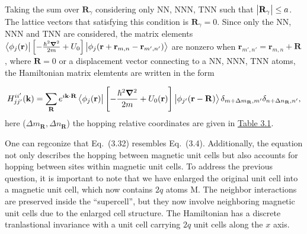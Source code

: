 Taking the sum over $\mathbf{R}_{\gamma}$ considering only \ac{NN}, \ac{NNN}, \ac{TNN} such that $\abs{\mathbf{R}_{\gamma}} \leq a$. The lattice vectors that satisfying this condition is $\mathbf{R}_{\gamma} = 0$. 
Since only the \ac{NN}, \ac{NNN} and \ac{TNN} are considered, the matrix elements $\bra{\phi_{j}(\mathbf{r})} \left[-\tfrac{\hbar^{2} \boldsymbol{\nabla}^{2}}{2m} + U_{0}\right] \ket{\phi_{j}(\mathbf{r} + \mathbf{r}_{m,n} - \mathbf{r}_{m',n'})}$ are nonzero when $\mathbf{r}_{m',n'} = \mathbf{r}_{m,n} + \mathbf{R}$, where $\mathbf{R} = 0$ or a displacement vector connecting to a \ac{NN}, \ac{NNN}, \ac{TNN} atoms, the Hamiltonian matrix elemtents are written in the form

\begin{gather}
	H_{jj'}^{ii'}(\mathbf{k}) =\sum_{\mathbf{R}} e^{i \mathbf{k}\cdot \mathbf{R}} \bra{\phi_{j}(\mathbf{r})} \left[-\dfrac{\hbar^{2} \boldsymbol{\nabla}^{2}}{2m} + U_{0}(\mathbf{r})\right] \ket{\phi_{j'}(\mathbf{r}-\mathbf{R})}\delta_{m + \Delta m_{\mathbf{R}},m'} \delta_{n + \Delta n_{\mathbf{R}},n'},
\end{gather}
here ($\Delta m_{\mathbf{R}}, \Delta n_{\mathbf{R}}$) the hopping relative coordinates are given in \hyperref[Table 2.1]{Table 3.1}. 

One can regconize that Eq.~(3.32) resembles Eq.~(3.4). Additionally, the equation not only describes the hopping between magnetic unit cells but also accounts for hopping between sites within magnetic unit cells. To address the previous question, it is important to note that we have enlarged the original unit cell into a magnetic unit cell, which now contains $2q$ atoms M. The neighbor interactions are preserved inside the ``supercell'', but they now involve neighboring magnetic unit cells due to the enlarged cell structure. The Hamiltonian has a discrete tranlastional invariance with a unit cell carrying $2q$ unit cells along the $x$ axis.

